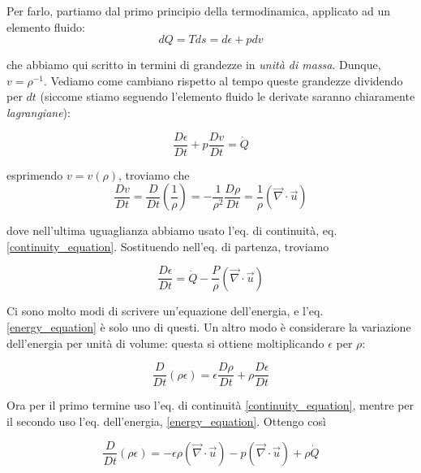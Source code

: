 \documentclass{report}
\begin{document}
Per farlo, partiamo dal primo principio della termodinamica, applicato ad un elemento fluido: 
\begin{equation}
    dQ = Tds = d\epsilon + pdv
\end{equation}

che abbiamo qui scritto in termini di grandezze in \emph{unità di massa}. Dunque, $v = \rho^{-1}$. Vediamo come cambiano rispetto al tempo queste grandezze dividendo per $dt$ (siccome stiamo seguendo l'elemento fluido le derivate saranno chiaramente \emph{lagrangiane}): 

\begin{equation}
    \frac{D\epsilon}{Dt} + p\frac{Dv}{Dt} = \dot{Q}
\end{equation}

esprimendo $v = v(\rho)$, troviamo che 
\begin{equation}
    \frac{Dv}{Dt} = \frac{D}{Dt}\left(\frac{1}{\rho} \right) = -\frac{1}{\rho^2}\frac{D\rho}{Dt} = \frac{1}{\rho}(\vec{\nabla} \cdot \vec{u})
\end{equation}

dove nell'ultima uguaglianza abbiamo usato l'eq. di continuità, eq. \ref{continuity_equation}. Sostituendo nell'eq. di partenza, troviamo 

\begin{tcolorbox}[colback=myg!15, colframe=black, boxrule=1pt]
\begin{equation}
    \label{energy_equation}
    \frac{D\epsilon}{Dt} = \dot{Q} - \frac{P}{\rho}(\vec{\nabla}\cdot \vec{u})
\end{equation}
\end{tcolorbox}

Ci sono molto modi di scrivere un'equazione dell'energia, e l'eq. \ref{energy_equation} è solo uno di questi. Un altro modo è considerare la variazione dell'energia per unità di volume: questa si ottiene moltiplicando $\epsilon$ per $\rho$: 

\begin{equation}
    \frac{D}{Dt}(\rho\epsilon) = \epsilon\frac{D\rho}{Dt} + \rho\frac{D\epsilon}{Dt}
\end{equation}

Ora per il primo termine uso l'eq. di continuità \ref{continuity_equation}, mentre per il secondo uso l'eq. dell'energia, \ref{energy_equation}. Ottengo così

\begin{equation}
    \frac{D}{Dt}(\rho\epsilon) = -\epsilon\rho(\vec{\nabla}\cdot \vec{u}) - p(\vec{\nabla}  \cdot \vec{u}) + \rho\dot{Q}
\end{equation}
\end{document}
